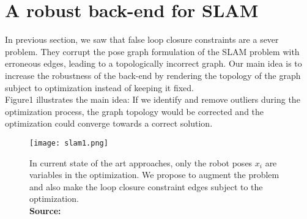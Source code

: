 \documentclass[9pt,technote]{IEEEtran}
\newcommand*{\captionsource}[2]{%
  \caption[{#1}]{%
    #1%
    \\\hspace{\linewidth}%
    \textbf{Source:} #2%
  }%
}
\begin{document}
\iffalse
Least squares problems can be mathematically solved by many algorithms. Previous researches have been done to use these methods in the context of SLAM and solve it in its least square formulation problem.
However, a major problem of these current optimization approaches arises from the strict division into a front-end and a back-end part.
We know that the front-end is responsible for sensor data processing, data association and graph construction.
In the other hand the back-end part relies on it heavily and considers the data association a solved problem.
Any errors occurring in the front-end will have catastrophic impact on the resultant map and robot state estimates. This is due to the nature of the back-end which a least square problem solver and thus vulnerable to outliers and errors.   
Typical data association errors happening in SLAM are false-positive closure constraints:  Due to the high self-similarity of many indoor and outdoor environments, two distinct places can actually appear to be very similar to the sensor.
\fi 
\section{A robust back-end for SLAM}
In previous section, we saw that false loop closure constraints are a sever problem. They corrupt the pose graph formulation of the SLAM problem with erroneous
edges, leading to a topologically incorrect graph. 
Our main idea is to increase the robustness of the back-end by rendering the topology of the graph subject to optimization instead of keeping it fixed.\\
Figure1 illustrates the main idea: If we identify and remove outliers during the optimization process, the graph topology would be corrected and the optimization could converge towards a correct solution.
\begin{figure}[h!]
  \centering
  \texttt{[image: slam1.png]}
  \captionsource{In current state of the art approaches, only the robot poses $x_{i}$ are variables
in the optimization. We propose to augment the problem and also make the loop closure constraint edges subject to the optimization.}{\cite{sunderhauf2012robust}}
\end{figure}
\end{document}

